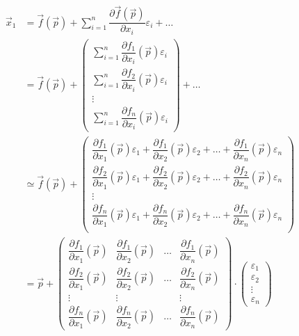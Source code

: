 \documentclass[
  a4paper,
  oneside,
  final]{krantz}
\renewcommand{\epsilon}{\varepsilon}
\newcommand{\pder}[2]{\dfrac{\partial #1}{\partial#2}}
\theoremstyle{definition}
\theoremstyle{definition}
\theoremstyle{definition}
\theoremstyle{definition}
\theoremstyle{remark}
\begin{document}
\begin{align*}
 \vec{x}_{1} &= \vec{f}(\vec{p}) + \sum_{i=1}^{n} \dfrac{\partial \vec{f}(\vec{p})}{\partial x_{i}} \epsilon_{i} + \ldots \\   
             &= \vec{f}(\vec{p}) +  \begin{pmatrix}
                    \sum_{i=1}^{n}\dfrac{\partial f_1}{\partial x_i}(\vec{p}) \epsilon_{i} \\ 
                    \sum_{i=1}^{n}\dfrac{\partial f_2}{\partial x_i}(\vec{p}) \epsilon_{i}\\ 
                    \vdots \\
                    \sum_{i=1}^{n} \dfrac{\partial f_n}{\partial x_i}(\vec{p}) \epsilon_{i}
                \end{pmatrix} + \ldots \\
                &\simeq  \vec{f}(\vec{p}) +  \begin{pmatrix}
                    \dfrac{\partial f_1}{\partial x_1}(\vec{p}) \epsilon_{1} + \dfrac{\partial f_1}{\partial x_2}(\vec{p}) \epsilon_{2}   + \ldots + \dfrac{\partial f_1}{\partial x_n}(\vec{p}) \epsilon_{n}  \\ 
                    \dfrac{\partial f_2}{\partial x_1}(\vec{p}) \epsilon_{1} + \dfrac{\partial f_2}{\partial x_2}(\vec{p}) \epsilon_{2}   + \ldots + \dfrac{\partial f_2}{\partial x_n}(\vec{p}) \epsilon_{n}  \\  
                    \vdots \\
                    \dfrac{\partial f_n}{\partial x_1}(\vec{p}) \epsilon_{1} + \dfrac{\partial f_n}{\partial x_2}(\vec{p}) \epsilon_{2}   + \ldots + \dfrac{\partial f_n}{\partial x_n}(\vec{p}) \epsilon_{n}  \\ 
                \end{pmatrix} \\
            &=  \vec{p} + \begin{pmatrix}
                            \pder{f_1}{x_1}(\vec{p}) & \pder{f_1}{x_2}(\vec{p}) & \ldots & \pder{f_1}{x_n}(\vec{p}) \\
                            \pder{f_2}{x_1}(\vec{p}) & \pder{f_2}{x_2}(\vec{p}) & \ldots & \pder{f_2}{x_n}(\vec{p}) \\
                            \vdots & \vdots & & \vdots \\
                            \pder{f_n}{x_1}(\vec{p}) & \pder{f_n}{x_2}(\vec{p}) & \ldots & \pder{f_n}{x_n}(\vec{p})                            
                          \end{pmatrix} \cdot \begin{pmatrix} \epsilon_1 \\ \epsilon_2  \\ \vdots \\ \epsilon_n \end{pmatrix}
\end{align*}
\end{document}
